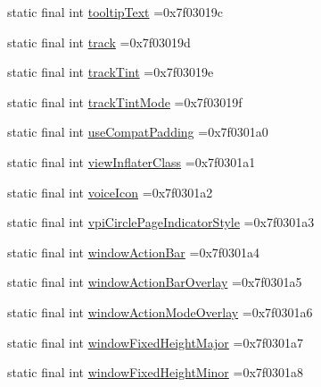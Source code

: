 \begin{DoxyCompactItemize}
\item 
static final int \mbox{\hyperlink{classcom_1_1example_1_1trainawearapplication_1_1_r_1_1attr_ad8bb6c3bd7079cfe2544b0ae9e9f6b4b}{tooltip\+Text}} =0x7f03019c
\item 
static final int \mbox{\hyperlink{classcom_1_1example_1_1trainawearapplication_1_1_r_1_1attr_a98307f15b2f023fe9c80a728227bbb0a}{track}} =0x7f03019d
\item 
static final int \mbox{\hyperlink{classcom_1_1example_1_1trainawearapplication_1_1_r_1_1attr_a99669c072a359dede0ac1bed4ca603fa}{track\+Tint}} =0x7f03019e
\item 
static final int \mbox{\hyperlink{classcom_1_1example_1_1trainawearapplication_1_1_r_1_1attr_a27b3589621c1e045bc8b3818fbfe69a9}{track\+Tint\+Mode}} =0x7f03019f
\item 
static final int \mbox{\hyperlink{classcom_1_1example_1_1trainawearapplication_1_1_r_1_1attr_a056ce18344d74d416456d8116cce6088}{use\+Compat\+Padding}} =0x7f0301a0
\item 
static final int \mbox{\hyperlink{classcom_1_1example_1_1trainawearapplication_1_1_r_1_1attr_ab29a9f9d52b04d35c24d624efe2897ef}{view\+Inflater\+Class}} =0x7f0301a1
\item 
static final int \mbox{\hyperlink{classcom_1_1example_1_1trainawearapplication_1_1_r_1_1attr_a511371b0397ae0981b2bdd6ec8c36f09}{voice\+Icon}} =0x7f0301a2
\item 
static final int \mbox{\hyperlink{classcom_1_1example_1_1trainawearapplication_1_1_r_1_1attr_abac146ef8b937bcdc13f11bc643c307e}{vpi\+Circle\+Page\+Indicator\+Style}} =0x7f0301a3
\item 
static final int \mbox{\hyperlink{classcom_1_1example_1_1trainawearapplication_1_1_r_1_1attr_a9cf36998626969e21a821ad9fcd1e695}{window\+Action\+Bar}} =0x7f0301a4
\item 
static final int \mbox{\hyperlink{classcom_1_1example_1_1trainawearapplication_1_1_r_1_1attr_a05622340ba01882c47f12c0a6528b343}{window\+Action\+Bar\+Overlay}} =0x7f0301a5
\item 
static final int \mbox{\hyperlink{classcom_1_1example_1_1trainawearapplication_1_1_r_1_1attr_a3b26e19afb945bcd45ae3a91b2ae9627}{window\+Action\+Mode\+Overlay}} =0x7f0301a6
\item 
static final int \mbox{\hyperlink{classcom_1_1example_1_1trainawearapplication_1_1_r_1_1attr_a512535868802d6f5c9ae0bc248d87c84}{window\+Fixed\+Height\+Major}} =0x7f0301a7
\item 
static final int \mbox{\hyperlink{classcom_1_1example_1_1trainawearapplication_1_1_r_1_1attr_aa01d13f7fad760b1651198d67c0fb0df}{window\+Fixed\+Height\+Minor}} =0x7f0301a8

\end{DoxyCompactItemize}
